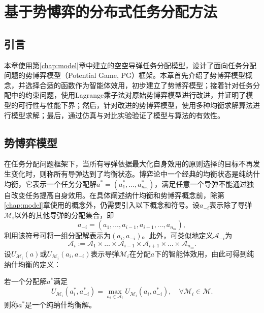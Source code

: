 
\chapter{基于势博弈的分布式任务分配方法}
\label{chap:pg}



\section{引言}
\label{pg:intro}

本章使用第\ref{chap:model}章中建立的空空导弹任务分配模型，设计了面向任务分配问题的势博弈模型（Potential Game, PG）框架。本章首先介绍了势博弈模型概念，并选择合适的函数作为智能体效用，初步建立了势博弈模型；接着针对任务分配中的约束问题，使用Lagrange乘子法对原始势博弈模型进行改进，并证明了模型的可行性与性能下界；然后，针对改进的势博弈模型，使用多种均衡求解算法进行模型求解；最后，通过仿真与对比实验验证了模型与算法的有效性。

\section{势博弈模型}
\label{pg:model}
在任务分配问题框架下，当所有导弹依据最大化自身效用的原则选择的目标不再发生变化时，则称所有导弹达到了均衡状态。博弈论中一个经典的均衡状态是纯纳什均衡，它表示一个任务分配解$a^*=(a_1^*,\dots,a_{n_m}^*)$，满足任意一个导弹不能通过独自改变任务提高自身效用。在具体阐述纳什均衡和势博弈概念前，除第\ref{chap:model}章使用的概念外，仍需要引入以下概念和符号。设$a_{-i}$表示除了导弹$\mathcal{M}_i$以外的其他导弹的分配集合，即
\[
a_{-i}=(a_1,\dots,a_{i-1},a_{i+1},\dots,a_{n_m}),
\]
利用该符号可将一组分配解表示为$(a_i,a_{-i})$。此外，可类似地定义$\mathcal{A}_{-i}$为
\[
\mathcal{A}_i:=\mathcal{A}_1 \times \dots \times \mathcal{A}_{i-1} \times \mathcal{A}_{i+1} \times \dots \times \mathcal{A}_{n_m} .
\]
设$U_{\mathcal{M}_i}(a)$或$U_{\mathcal{M}_i}(a_i,a_{-i})$表示导弹$\mathcal{M}_i$在分配$a$下的智能体效用，由此可得到纯纳什均衡的定义：
\begin{definition}[纯纳什均衡]
\label{pg:def:pureNash}
	若一个分配解$a^*$满足
	\begin{equation}
\label{pg:eq:pure_Nash}
	U_{\mathcal{M}_i}(a_i^*,a_{-i}^*)=\max_{a_i\in \mathcal{A}_i}U_{\mathcal{M}_i}(a_i,a_{-i}^*),\quad \forall \mathcal{M}_i \in \mathcal{M}.
\end{equation}
则称$a^*$是一个纯纳什均衡解。
\end{definition}

